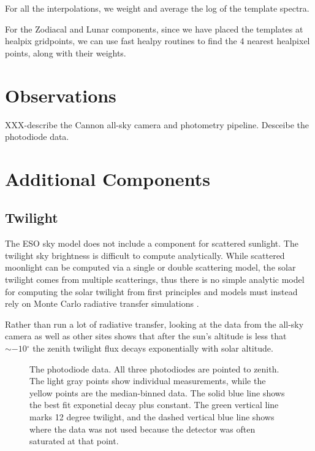 \documentclass{emulateapj}  %
\newcommand\degree{{^\circ}}
\begin{document}
For all the interpolations, we weight and average the log of the template spectra.

For the Zodiacal and Lunar components, since we have placed the templates at healpix gridpoints, we can use fast healpy routines to find the 4 nearest healpixel points, along with their weights.  



\section{Observations}

XXX-describe the Cannon all-sky camera and photometry pipeline. Desceibe the photodiode data.  


\section{Additional Components}
\subsection{Twilight}

The ESO sky model does not include a component for scattered sunlight.  The twilight sky brightness is difficult to compute analytically.  While scattered moonlight can be computed via a single or double scattering model, the solar twilight comes from multiple scatterings, thus there is no simple analytic model for computing the solar twilight from first principles and models must instead rely on Monte Carlo radiative transfer simulations \citep{Patat06}.

Rather than run a lot of radiative transfer, looking at the data from the all-sky camera as well as other sites shows that after the sun's altitude is less that $\sim-10\degree$ the zenith twilight flux decays exponentially with solar altitude.

\begin{figure*}
  \caption{The photodiode data.  All three photodiodes are pointed to zenith. The light gray points show individual measurements, while the yellow points are the median-binned data. The solid blue line shows the best fit exponetial decay plus constant. The green vertical line marks 12 degree twilight, and the dashed vertical blue line shows where the data was not used because the detector was often saturated at that point. \label{diodePlot}}
\end{figure*}
\end{document}
